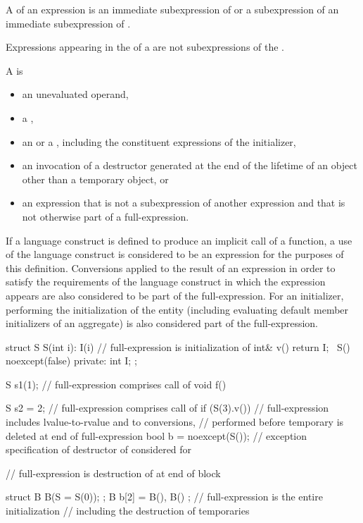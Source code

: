 \pnum
A  of an expression  is
an immediate subexpression of  or
a subexpression of an immediate subexpression of .
\begin{note}
Expressions appearing in the  of a 
are not subexpressions of the .
\end{note}

\pnum
A  is
\begin{itemize}
\item
an unevaluated operand,
\item
a ,
\item
an  or
a ,
including the constituent expressions of the initializer,
\item
an invocation of a destructor generated at the end of the lifetime
of an object other than a temporary object, or
\item
an expression that is not a subexpression of another expression and
that is not otherwise part of a full-expression.
\end{itemize}
If a language construct is defined to produce an implicit call of a function,
a use of the language construct is considered to be an expression
for the purposes of this definition.
Conversions applied to the result of an expression in order to satisfy the requirements
of the language construct in which the expression appears
are also considered to be part of the full-expression.
For an initializer, performing the initialization of the entity
(including evaluating default member initializers of an aggregate)
is also considered part of the full-expression.
\begin{example}
\begin{codeblock}
struct S {
  S(int i): I(i) { }            // full-expression is initialization of 
  int& v() { return I; }
  ~S() noexcept(false) { }
private:
  int I;
};

S s1(1);                        // full-expression comprises call of 
void f() {
  S s2 = 2;                     // full-expression comprises call of 
  if (S(3).v())                 // full-expression includes lvalue-to-rvalue and  to  conversions,
                                // performed before temporary is deleted at end of full-expression
  { }
  bool b = noexcept(S());       // exception specification of destructor of  considered for 

  // full-expression is destruction of  at end of block
}
struct B {
  B(S = S(0));
};
B b[2] = { B(), B() };          // full-expression is the entire initialization
                                // including the destruction of temporaries
\end{codeblock}
\end{example}

